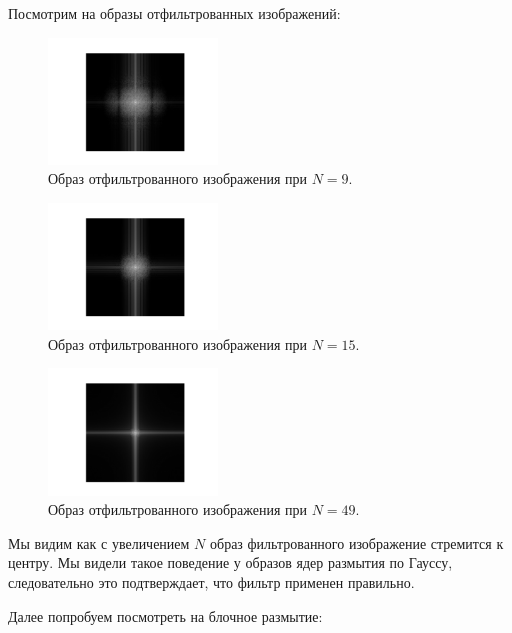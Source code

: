 \documentclass[a4paper]{article}
\begin{document}
Посмотрим на образы отфильтрованных изображений:
\begin{figure}[H]
  \centering
  \includegraphics[width=0.4\textwidth]{src/ifft_spec_gauss_9.png}
  \caption{Образ отфильтрованного изображения при $N=9$.}
\end{figure}
\begin{figure}[H]
  \centering
  \includegraphics[width=0.4\textwidth]{src/ifft_spec_gauss_15.png}
  \caption{Образ отфильтрованного изображения при $N=15$.}
\end{figure}
\begin{figure}[H]
  \centering
  \includegraphics[width=0.4\textwidth]{src/ifft_spec_gauss_49.png}
  \caption{Образ отфильтрованного изображения при $N=49$.}
\end{figure}

\noindent Мы видим как с увеличением $N$ образ фильтрованного изображение стремится к центру. Мы видели такое поведение у образов ядер размытия по Гауссу, следовательно это подтверждает, что фильтр применен правильно.

Далее попробуем посмотреть на блочное размытие: 
\end{document}
